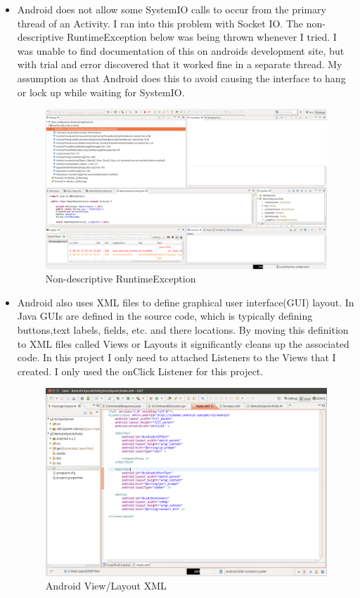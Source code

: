 \documentclass[12pt]{article}
\begin{document}
\begin{itemize}
\item Android does not allow some SystemIO calls to occur from the primary thread of an Activity.  I ran into this problem with Socket IO.  The non-descriptive RuntimeException below was being thrown whenever I tried. I was unable to find documentation of this on androids development site, but with trial and error discovered that it worked fine in a separate thread. My assumption as that Android does this to avoid causing the interface to hang or lock up while waiting for SystemIO.
\begin{figure}[h]
\includegraphics[width=1\textwidth]{runtimeexception.png}
\caption{Non-descriptive RuntimeException}
\end{figure}

\item Android also uses XML files to define graphical user interface(GUI) layout. In Java GUIs are defined in the source code, which is typically defining buttons,text labels, fields, etc. and there locations. By moving this definition to XML files called Views or Layouts it significantly cleans up the associated code. In this project I only need to attached Listeners to the Views that I created. I only used the onClick Listener for this project.

\begin{figure}[h]
\includegraphics[width=1\textwidth]{view-xml.png}
\caption{Android View/Layout XML}
\end{figure}


\end{itemize}
\end{document}

